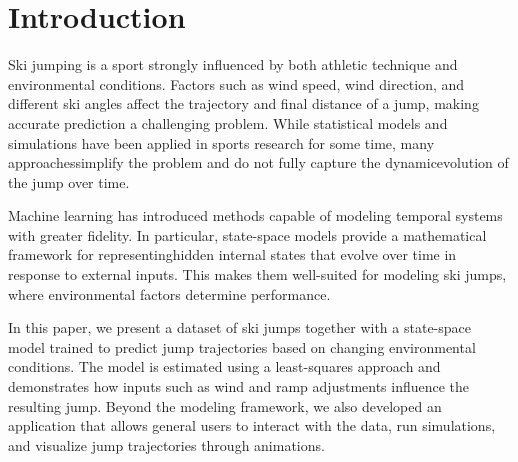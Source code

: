 \documentclass[sigconf,natbib=false, language=english]{acmart}
\begin{document}


\maketitle

\section{Introduction}



Ski jumping is a sport strongly influenced by both athletic technique and environmental conditions. Factors such as wind speed, wind direction, and different ski angles affect the trajectory and final distance of a jump, making accurate prediction a challenging problem. While statistical models and simulations have been applied in sports research for some time, many approaches\linebreak simplify the problem and do not fully capture the dynamic\linebreak evolution of the jump over time.

Machine learning has introduced methods capable of modeling temporal systems with greater fidelity. In particular, state-space models provide a mathematical framework for representing\linebreak hidden internal states that evolve over time in response to external inputs. This makes them well-suited for modeling ski jumps, where environmental factors determine performance.

In this paper, we present a dataset of ski jumps together with a state-space model trained to predict jump trajectories based on changing environmental conditions. The model is estimated using a least-squares approach and demonstrates how inputs such as wind and ramp adjustments influence the resulting jump. Beyond the modeling framework, we also developed an application that allows general users to interact with the data, run simulations, and visualize jump trajectories through animations. 
\end{document}
